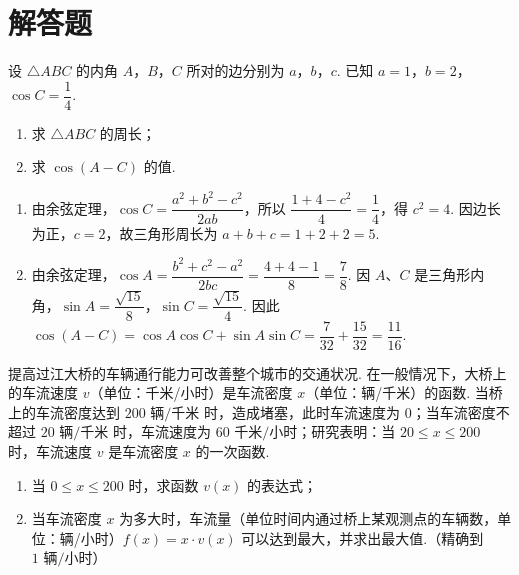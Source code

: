 \section{解答题}

\begin{problem}
设 \(\triangle ABC\) 的内角 \(A\)，\(B\)，\(C\) 所对的边分别为 \(a\)，\(b\)，\(c\). 已知 \(a=1\)，\(b=2\)，\(\cos C=\dfrac{1}{4}\).
\begin{enumerate}
\item 求 \(\triangle ABC\) 的周长；
\item 求 \(\cos(A-C)\) 的值.
\end{enumerate}
\end{problem}

\begin{solution}
\begin{enumerate}
\item 由余弦定理，\(\cos C=\dfrac{a^2+b^2-c^2}{2ab}\)，所以 \(\dfrac{1+4-c^2}{4}=\dfrac{1}{4}\)，得 \(c^2=4\). 因边长为正，\(c=2\)，故三角形周长为 \(a+b+c=1+2+2=5\).
\item 由余弦定理，\(\cos A=\dfrac{b^2+c^2-a^2}{2bc}=\dfrac{4+4-1}{8}=\dfrac{7}{8}\). 因 \(A\)、\(C\) 是三角形内角，\(\sin A=\dfrac{\sqrt{15}}{8}\)，\(\sin C=\dfrac{\sqrt{15}}{4}\). 因此 \(\cos(A-C)=\cos A\cos C+\sin A\sin C=\dfrac{7}{32}+\dfrac{15}{32}=\dfrac{11}{16}\).
\end{enumerate}
\end{solution}

\begin{problem}
提高过江大桥的车辆通行能力可改善整个城市的交通状况. 在一般情况下，大桥上的车流速度 \(v\)（单位：千米/小时）是车流密度 \(x\)（单位：辆/千米）的函数. 当桥上的车流密度达到 \(200\text{ 辆/千米}\) 时，造成堵塞，此时车流速度为 \(0\)；当车流密度不超过 \(20\text{ 辆/千米}\) 时，车流速度为 \(60\text{ 千米/小时}\)；研究表明：当 \(20\leqslant x\leqslant200\) 时，车流速度 \(v\) 是车流密度 \(x\) 的一次函数.
\begin{enumerate}
\item 当 \(0\leqslant x\leqslant200\) 时，求函数 \(v(x)\) 的表达式；
\item 当车流密度 \(x\) 为多大时，车流量（单位时间内通过桥上某观测点的车辆数，单位：辆/小时）\(f(x)=x\cdot v(x)\) 可以达到最大，并求出最大值.（精确到 \(1\text{ 辆/小时}\)）
\end{enumerate}
\end{problem}

